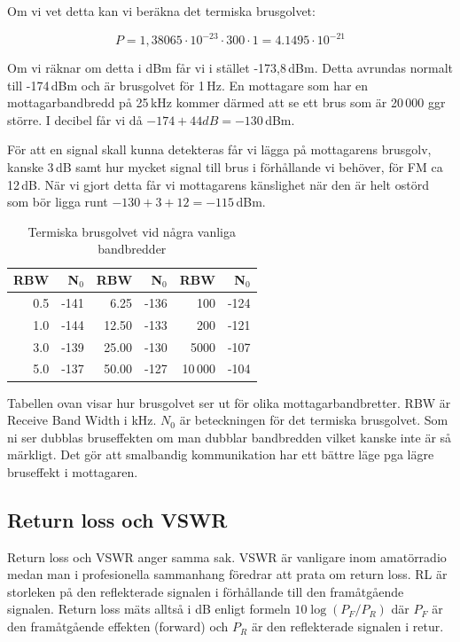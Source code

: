 Om vi vet detta kan vi beräkna det termiska brusgolvet:

$$P = 1,38065\cdot 10^{-23} \cdot 300 \cdot 1 = 4.1495\cdot 10^{-21}$$

Om vi räknar om detta i dBm får vi i stället -173,8\,dBm. Detta avrundas normalt till -174\,dBm och är brusgolvet för 1\,Hz. En mottagare som har en mottagarbandbredd på 25\,kHz kommer därmed att se ett brus som är 20\,000 ggr större. I decibel får vi då $-174 + 44 dB = -130$\,dBm.

För att en signal skall kunna detekteras får vi lägga på mottagarens brusgolv, kanske 3\,dB samt hur mycket signal till brus i förhållande vi behöver, för FM ca 12\,dB. När vi gjort detta får vi mottagarens känslighet när den är helt ostörd som bör ligga runt $-130 + 3 + 12 = -115$\,dBm.

\begin{table}[H]
\centering
\begin{tabular}{rr|rr|rr}
	\textbf{RBW} & \textbf{N$_0$} & \textbf{RBW} & \textbf{N$_0$} & \textbf{RBW} & \textbf{N$_0$} \\ \hline
	         0.5 &           -141 &         6.25 &           -136 &          100 &           -124 \\
	         1.0 &           -144 &        12.50 &           -133 &          200 &           -121 \\
	         3.0 &           -139 &        25.00 &           -130 &         5000 &           -107 \\
	         5.0 &           -137 &        50.00 &           -127 &        10\,000 &           -104
\end{tabular}
\caption{Termiska brusgolvet vid några vanliga bandbredder}
\end{table}

Tabellen ovan visar hur brusgolvet ser ut för olika mottagarbandbretter. RBW är Receive Band Width i kHz. $N_0$ är beteckningen för det termiska brusgolvet. Som ni ser dubblas bruseffekten om man dubblar bandbredden vilket kanske inte är så märkligt. Det gör att smalbandig kommunikation har ett bättre läge pga lägre bruseffekt i mottagaren.


\subsection{Return loss och VSWR}

Return loss och VSWR anger samma sak. VSWR är vanligare inom amatörradio medan man i profesionella sammanhang föredrar att prata om return loss. RL är storleken på den reflekterade signalen i förhållande till den framåtgående signalen. Return loss mäts alltså i dB enligt formeln $10\log(P_F/P_R)$ där $P_F$ är den framåtgående effekten (forward) och  $P_R$ är den reflekterade signalen i retur.

